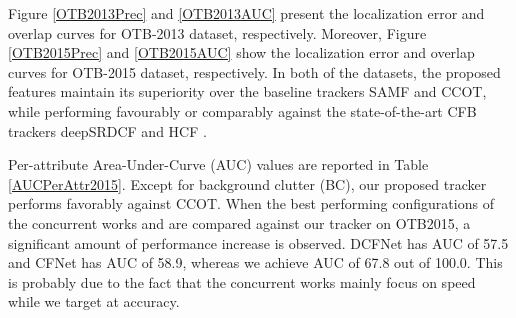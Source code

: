 \documentclass[journal]{IEEEtran}
\begin{document}
Figure \ref{OTB2013Prec} and \ref{OTB2013AUC} present the localization error and overlap curves for OTB-2013 dataset, respectively. Moreover, Figure \ref{OTB2015Prec} and \ref{OTB2015AUC} show the localization error and overlap curves for OTB-2015 dataset, respectively. In both of the datasets, the proposed features maintain its superiority over the baseline trackers SAMF and CCOT, while performing favourably or comparably against the state-of-the-art CFB trackers deepSRDCF \cite{deepSRDCF} and HCF \cite{HCF}.
\begin{table}
\caption{\label{AUCPerAttr2015}\small AUC values for 11 attributes for 100 sequences of \cite{BenchmarkPAMI}.}
\normalsize
{}
\end{table}
Per-attribute Area-Under-Curve (AUC) values are reported in Table \ref{AUCPerAttr2015}. Except for background clutter (BC), our proposed tracker performs favorably against CCOT. When the best performing configurations of the concurrent works \cite{CFNet} and \cite{DCFNet} are compared against our tracker on OTB2015, a significant amount of performance increase is observed. DCFNet \cite{DCFNet} has AUC of 57.5 and CFNet \cite{CFNet} has AUC of 58.9, whereas we achieve AUC of 67.8 out of 100.0. This is probably due to the fact that the concurrent works mainly focus on speed while we target at accuracy.
\end{document}
